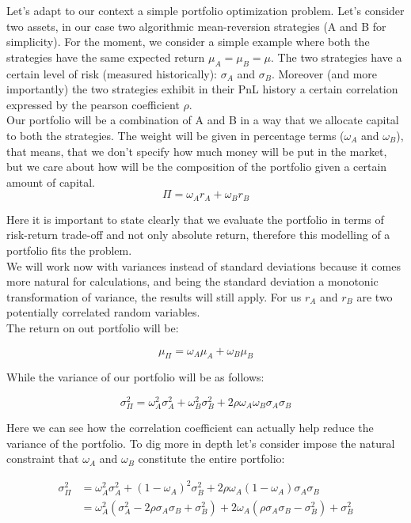 Let's adapt to our context a simple portfolio optimization problem. Let's consider two assets, in our case two algorithmic mean-reversion strategies (A and B for simplicity). For the moment, we consider a simple example where both the strategies have the same expected return $\mu_A = \mu_B = \mu$.
The two strategies have a certain level of risk (measured historically): $\sigma_A$ and $\sigma_B$. Moreover (and more importantly) the two strategies exhibit in their PnL history a certain correlation expressed by the pearson coefficient $\rho$.\\
Our portfolio will be a combination of A and B in a way that we allocate capital to both the strategies. The weight will be given in percentage terms ($\omega_A$ and $\omega_B$), that means, that we don't specify how much money will be put in the market, but we care about how will be the composition of the portfolio given a certain amount of capital.
$$
\Pi = \omega_A r_A + \omega_B r_B
$$

Here it is important to state clearly that we evaluate the portfolio in terms of risk-return trade-off and not only absolute return, therefore this modelling of a portfolio fits the problem.\\
We will work now with variances instead of standard deviations because it comes more natural for calculations, and being the standard deviation a monotonic transformation of variance, the results will still apply. For us $r_A$ and $r_B$ are two potentially correlated random variables.\\
The return on out portfolio will be:

\begin{equation} \label{portfolio_return}
\mu_\Pi = \omega_A \mu_A + \omega_B \mu_B 
\end{equation} 

While the variance of our portfolio will be as follows:

\begin{equation} \label{portfolio_var}
\sigma^2_\Pi = \omega_A^2 \sigma_A^2 + \omega_B^2 \sigma_B^2 + 2\rho \omega_A \omega_B\sigma_A \sigma_B
\end{equation} 

Here we can see how the correlation coefficient can actually help reduce the variance of the portfolio. To dig more in depth let's consider impose the natural constraint that $\omega_A$ and $\omega_B$ constitute the entire portfolio:


\begin{equation} \label{eq1}
\begin{split}
\sigma^2_\Pi &= \omega_A^2 \sigma_A^2 + (1 - \omega_A)^2 \sigma_B^2 + 2\rho \omega_A (1 - \omega_A)\sigma_A \sigma_B \\
             & = \omega_A^2(\sigma_A^2 - 2\rho \sigma_A \sigma_B + \sigma_B^2) + 2\omega_A(\rho \sigma_A \sigma_B - \sigma_B^2) + \sigma_B^2
\end{split}
\end{equation}

